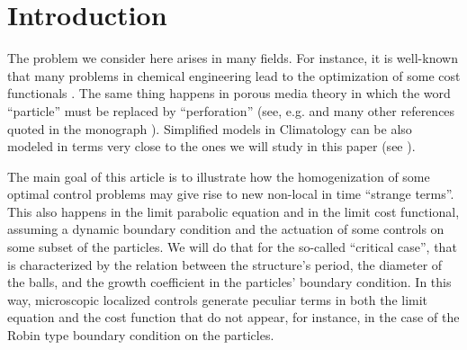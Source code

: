 \documentclass[reqno]{amsart}
\begin{document}
\section{Introduction}

The problem we consider here arises in many fields. For instance,
it is well-known that many problems in chemical engineering lead to the
optimization of some cost functionals
\cite{Nolasco-Survey, Upreti book}. The same thing happens in
porous media theory in which the word ``particle''  must be replaced by
``perforation''  (see, e.g.
\cite{ Anguiano, ConcaDliTi,  GoSanchezP, Hornung-Yaeger, Hurlov,  
Iliev-Mikelik, OlSh95, Timof} and many other
references quoted in the monograph \cite{DiGoShBook}).
Simplified models in Climatology can be also modeled in terms very close to the
ones we will study in this paper (see \cite{DiPoShRACSAM}).

The main goal of this article is to illustrate how the homogenization of some
optimal control problems may give rise to new non-local in time ``strange
terms''. This also happens in the limit parabolic equation and in the limit
cost functional, assuming a dynamic boundary condition and the actuation of some
controls on some subset of the particles.
We will do that for the so-called
``critical case'', that is characterized
by the relation between the structure's period, the diameter of the
balls, and the growth coefficient in the particles' boundary condition.
In this way, microscopic localized controls generate peculiar terms in both
the limit equation and the cost function that do not appear, for instance, in
the case of the Robin type boundary condition on the particles.
\end{document}
